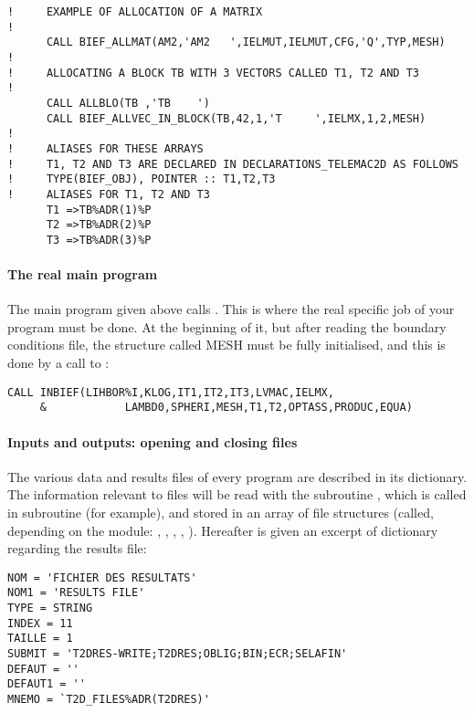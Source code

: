 \begin{lstlisting}[language=TelFortran]
!     EXAMPLE OF ALLOCATION OF A MATRIX
!
      CALL BIEF_ALLMAT(AM2,'AM2   ',IELMUT,IELMUT,CFG,'Q',TYP,MESH)
!
!     ALLOCATING A BLOCK TB WITH 3 VECTORS CALLED T1, T2 AND T3
!
      CALL ALLBLO(TB ,'TB    ')
      CALL BIEF_ALLVEC_IN_BLOCK(TB,42,1,'T     ',IELMX,1,2,MESH)
!
!     ALIASES FOR THESE ARRAYS
!     T1, T2 AND T3 ARE DECLARED IN DECLARATIONS_TELEMAC2D AS FOLLOWS
!     TYPE(BIEF_OBJ), POINTER :: T1,T2,T3
!     ALIASES FOR T1, T2 AND T3
      T1 =>TB%ADR(1)%P
      T2 =>TB%ADR(2)%P
      T3 =>TB%ADR(3)%P
\end{lstlisting}

\paragraph{The real main program}

The main program  given above calls .
This is where the real specific job of your program must be done. At the
beginning of it, but after reading the boundary conditions file, the
 structure called MESH must be fully initialised, and this
is done by a call to :

\begin{lstlisting}[language=TelFortran]
      CALL INBIEF(LIHBOR%I,KLOG,IT1,IT2,IT3,LVMAC,IELMX,
     &            LAMBD0,SPHERI,MESH,T1,T2,OPTASS,PRODUC,EQUA)
\end{lstlisting}

\paragraph{Inputs and outputs: opening and closing files}

The various data and results files of every \tel program are described in
its dictionary. The information relevant to files will be read with the
subroutine , which is called in subroutine
 (for example), and stored in an array of file
structures (called, depending on the \tel module: ,
, , ,
). Hereafter is given an excerpt of  dictionary
regarding the results file:

\begin{lstlisting}[language=TelemacCas]
NOM = 'FICHIER DES RESULTATS'
NOM1 = 'RESULTS FILE'
TYPE = STRING
INDEX = 11
TAILLE = 1
SUBMIT = 'T2DRES-WRITE;T2DRES;OBLIG;BIN;ECR;SELAFIN'
DEFAUT = ''
DEFAUT1 = ''
MNEMO = `T2D_FILES%ADR(T2DRES)'
\end{lstlisting}

